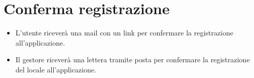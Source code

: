 \section{Conferma registrazione}
\begin{itemize}
    \item L'utente riceverà una mail con un link per confermare la registrazione all'applicazione.
    \item Il gestore riceverà una lettera tramite posta per confermare la registrazione del locale all'applicazione.
\end{itemize}
